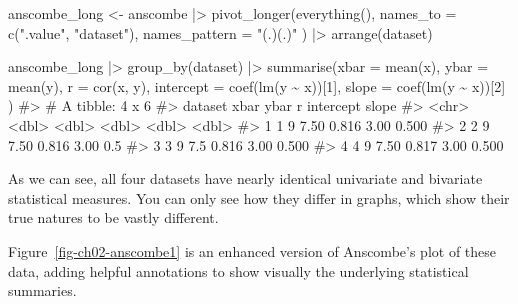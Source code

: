 \documentclass[
  letterpaper,
  10pt,
  krantz2]{krantz}
\makeatletter
\newenvironment{Shaded}{\begin{snugshade}}{\end{snugshade}}
\newcommand{\AttributeTok}[1]{\textcolor[rgb]{0.40,0.45,0.13}{#1}}
\newcommand{\CommentTok}[1]{\textcolor[rgb]{0.37,0.37,0.37}{#1}}
\newcommand{\DecValTok}[1]{\textcolor[rgb]{0.68,0.00,0.00}{#1}}
\newcommand{\FunctionTok}[1]{\textcolor[rgb]{0.28,0.35,0.67}{#1}}
\newcommand{\NormalTok}[1]{\textcolor[rgb]{0.00,0.23,0.31}{#1}}
\newcommand{\OtherTok}[1]{\textcolor[rgb]{0.00,0.23,0.31}{#1}}
\newcommand{\SpecialCharTok}[1]{\textcolor[rgb]{0.37,0.37,0.37}{#1}}
\newcommand{\StringTok}[1]{\textcolor[rgb]{0.13,0.47,0.30}{#1}}
\newenvironment{kframe}{%
  \medskip{}
  \setlength{\fboxsep}{.8em}
  \def\at@end@of@kframe{}%
  \ifinner\ifhmode%
  \def\at@end@of@kframe{\end{minipage}}%
  \begin{minipage}{\columnwidth}%
  \fi\fi%
  \def\FrameCommand##1{\hskip\@totalleftmargin \hskip-\fboxsep
  \colorbox{shadecolor}{##1}\hskip-\fboxsep
      \hskip-\linewidth \hskip-\@totalleftmargin \hskip\columnwidth}%
  \MakeFramed {\advance\hsize-\width
    \@totalleftmargin\z@ \linewidth\hsize
    \@setminipage}}%
{\par\unskip\endMakeFramed%
  \at@end@of@kframe}
\renewenvironment{Shaded}{\begin{kframe}}{\end{kframe}}
\makeatother
\begin{document}
\begin{Shaded}
\begin{Highlighting}[]
\NormalTok{anscombe\_long }\OtherTok{\textless{}{-}}\NormalTok{ anscombe }\SpecialCharTok{|\textgreater{}} 
  \FunctionTok{pivot\_longer}\NormalTok{(}\FunctionTok{everything}\NormalTok{(), }
               \AttributeTok{names\_to =} \FunctionTok{c}\NormalTok{(}\StringTok{".value"}\NormalTok{, }\StringTok{"dataset"}\NormalTok{), }
               \AttributeTok{names\_pattern =} \StringTok{"(.)(.)"}
\NormalTok{  ) }\SpecialCharTok{|\textgreater{}}
  \FunctionTok{arrange}\NormalTok{(dataset)}

\NormalTok{anscombe\_long }\SpecialCharTok{|\textgreater{}}
  \FunctionTok{group\_by}\NormalTok{(dataset) }\SpecialCharTok{|\textgreater{}}
  \FunctionTok{summarise}\NormalTok{(}\AttributeTok{xbar      =} \FunctionTok{mean}\NormalTok{(x),}
            \AttributeTok{ybar      =} \FunctionTok{mean}\NormalTok{(y),}
            \AttributeTok{r         =} \FunctionTok{cor}\NormalTok{(x, y),}
            \AttributeTok{intercept =} \FunctionTok{coef}\NormalTok{(}\FunctionTok{lm}\NormalTok{(y }\SpecialCharTok{\textasciitilde{}}\NormalTok{ x))[}\DecValTok{1}\NormalTok{],}
            \AttributeTok{slope     =} \FunctionTok{coef}\NormalTok{(}\FunctionTok{lm}\NormalTok{(y }\SpecialCharTok{\textasciitilde{}}\NormalTok{ x))[}\DecValTok{2}\NormalTok{]}
\NormalTok{         )}
\CommentTok{\#\textgreater{} \# A tibble: 4 x 6}
\CommentTok{\#\textgreater{}   dataset  xbar  ybar     r intercept slope}
\CommentTok{\#\textgreater{}   \textless{}chr\textgreater{}   \textless{}dbl\textgreater{} \textless{}dbl\textgreater{} \textless{}dbl\textgreater{}     \textless{}dbl\textgreater{} \textless{}dbl\textgreater{}}
\CommentTok{\#\textgreater{} 1 1           9  7.50 0.816      3.00 0.500}
\CommentTok{\#\textgreater{} 2 2           9  7.50 0.816      3.00 0.5  }
\CommentTok{\#\textgreater{} 3 3           9  7.5  0.816      3.00 0.500}
\CommentTok{\#\textgreater{} 4 4           9  7.50 0.817      3.00 0.500}
\end{Highlighting}
\end{Shaded}

As we can see, all four datasets have nearly identical univariate and
bivariate statistical measures. You can only see how they differ in
graphs, which show their true natures to be vastly different.

Figure~\ref{fig-ch02-anscombe1} is an enhanced version of Anscombe's
plot of these data, adding helpful annotations to show visually the
underlying statistical summaries.
\end{document}

